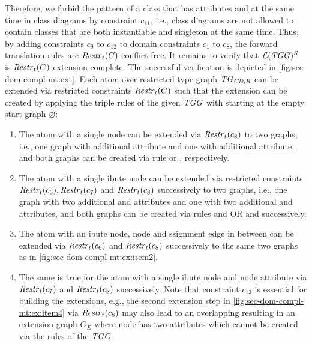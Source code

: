 \begin{example}
Therefore, we forbid the pattern of a class that has attributes  and  at the same time in class diagrams by constraint $c_{11}$, i.e., class diagrams are not allowed to contain classes that are both instantiable and singleton at the same time.
Thus, by adding constraints $c_9$ to $c_{12}$ to domain constraints $c_1$ to $c_8$, the forward translation rules are $\mathit{Restr}_t(C)$-conflict-free.
It remains to verify that $\mathcal{L}(\mathit{TGG})^S$ is $\mathit{Restr}_t(C)$-extension complete.
The successful verification is depicted in \cref{fig:sec-dom-compl-mt:ext}.
Each atom over restricted type graph $\mathit{TG}_{\mathit{CD},R}$ can be extended via restricted constraints $\mathit{Restr}_t(C)$ such that the extension can be created by applying the triple rules of the given $\mathit{TGG}$ with starting at the empty start graph $\varnothing$:
\begin{enumerate}
  \item \label{fig:sec-dom-compl-mt:ex:item1} The atom with a single  node can be extended via $\mathit{Restr}_t(c_8)$ to two graphs, i.e., one graph with additional  attribute and one with additional  attribute, and both graphs can be created via rule  or , respectively.
  \item \label{fig:sec-dom-compl-mt:ex:item2} The atom with a single ibute node can be extended via restricted constraints $\mathit{Restr}_t(c_6),\mathit{Restr}_t(c_7)$ and $\mathit{Restr}_t(c_8)$ successively to two graphs, i.e., one graph with two additional  and  attributes and one with two additional  and  attributes, and both graphs can be created via rules  and  OR  and  successively.
  \item \label{fig:sec-dom-compl-mt:ex:item3} The atom with an ibute node,  node and ssignment edge in between can be extended via $\mathit{Restr}_t(c_6)$ and $\mathit{Restr}_t(c_8)$ successively to the same two graphs as in \cref{fig:sec-dom-compl-mt:ex:item2}.
  \item \label{fig:sec-dom-compl-mt:ex:item4} The same is true for the atom with a single ibute node and node attribute  via $\mathit{Restr}_t(c_7)$ and $\mathit{Restr}_t(c_8)$ successively.
  Note that constraint $c_{13}$ is essential for building the extensions, e.g., the second extension step in \cref{fig:sec-dom-compl-mt:ex:item4} via $\mathit{Restr}_t(c_8)$ may also lead to an overlapping resulting in an extension graph $G_E$ where node  has two  attributes which cannot be created via the rules of the $\mathit{TGG}$.

\end{enumerate}
\end{example}
